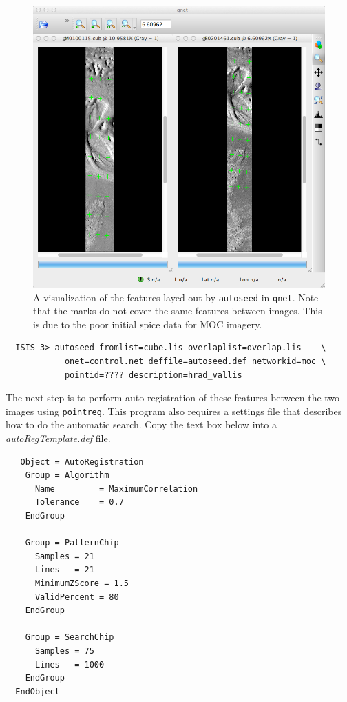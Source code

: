 \begin{figure}[ht]
  \centering
  \includegraphics[width=5in]{images/qnet/Qnet_AfterAutoseed.png}
  \caption{A visualization of the features layed out by
    \texttt{autoseed} in \texttt{qnet}. Note that the marks do not
    cover the same features between images. This is due to the poor
    initial spice data for MOC imagery.}
  \label{fig:after_autoseed}
\end{figure}

\begin{verbatim}
  ISIS 3> autoseed fromlist=cube.lis overlaplist=overlap.lis    \
            onet=control.net deffile=autoseed.def networkid=moc \
            pointid=???? description=hrad_vallis
\end{verbatim}

The next step is to perform auto registration of these features
between the two images using \texttt{pointreg}. This program also
requires a settings file that describes how to do the automatic
search. Copy the text box below into a \textit{autoRegTemplate.def}
file.

\begin{verbatim}
   Object = AutoRegistration
    Group = Algorithm
      Name         = MaximumCorrelation
      Tolerance    = 0.7
    EndGroup

    Group = PatternChip
      Samples = 21
      Lines   = 21
      MinimumZScore = 1.5
      ValidPercent = 80
    EndGroup

    Group = SearchChip
      Samples = 75
      Lines   = 1000
    EndGroup
  EndObject
\end{verbatim}


